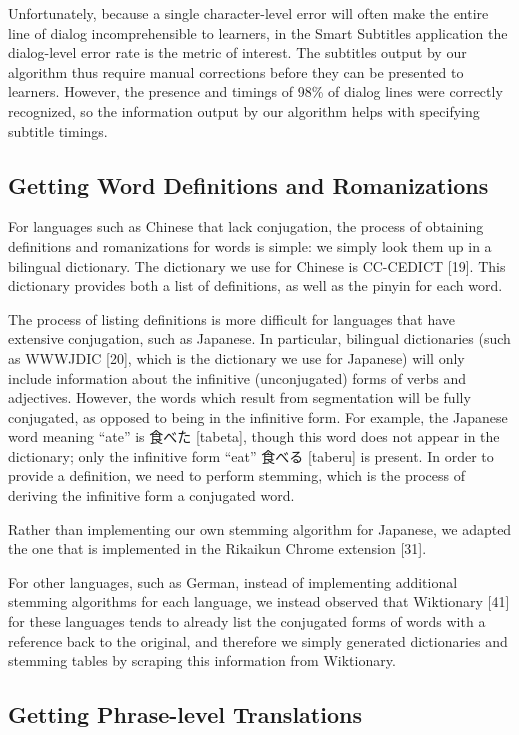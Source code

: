 \documentclass{sigchi}
\begin{document}
Unfortunately, because a single character-level error will often make the entire line of dialog incomprehensible to learners, in the Smart Subtitles application the dialog-level error rate is the metric of interest. The subtitles output by our algorithm thus require manual corrections before they can be presented to learners. However, the presence and timings of 98\% of dialog lines were correctly recognized, so the information output by our algorithm helps with specifying subtitle timings.

\subsection{Getting Word Definitions and Romanizations}

For languages such as Chinese that lack conjugation, the process of obtaining definitions and romanizations for words is simple: we simply look them up in a bilingual dictionary. The dictionary we use for Chinese is CC-CEDICT [19]. This dictionary provides both a list of definitions, as well as the pinyin for each word.

The process of listing definitions is more difficult for languages that have extensive conjugation, such as Japanese. In particular, bilingual dictionaries (such as WWWJDIC [20], which is the dictionary we use for Japanese) will only include information about the infinitive (unconjugated) forms of verbs and adjectives. However, the words which result from segmentation will be fully conjugated, as opposed to being in the infinitive form. For example, the Japanese word meaning “ate” is 食べた [tabeta], though this word does not appear in the dictionary; only the infinitive form “eat” 食べる [taberu] is present. In order to provide a definition, we need to perform stemming, which is the process of deriving the infinitive form a conjugated word.

Rather than implementing our own stemming algorithm for Japanese, we adapted the one that is implemented in the Rikaikun Chrome extension [31].

For other languages, such as German, instead of implementing additional stemming algorithms for each language, we instead observed that Wiktionary [41] for these languages tends to already list the conjugated forms of words with a reference back to the original, and therefore we simply generated dictionaries and stemming tables by scraping this information from Wiktionary.

\subsection{Getting Phrase-level Translations}
\end{document}
